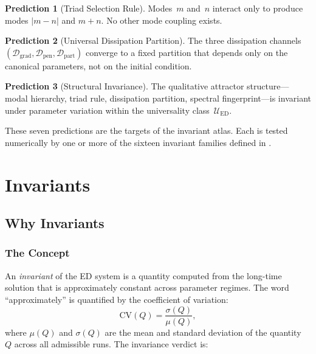 \documentclass[11pt,twoside,openright]{book}
\theoremstyle{definition}
\theoremstyle{plain}
\theoremstyle{definition}
\newtheorem{prediction}{Prediction}[chapter]
\theoremstyle{remark}
\newcommand{\Dgrad}{\mathcal{D}_{\mathrm{grad}}}
\newcommand{\Dpen}{\mathcal{D}_{\mathrm{pen}}}
\newcommand{\Dpart}{\mathcal{D}_{\mathrm{part}}}
\newcommand{\UED}{\mathcal{U}_{\mathrm{ED}}}
\newcommand{\CV}{\mathrm{CV}}
\begin{document}
\begin{prediction}[Triad Selection Rule]\label{pred:triad}
Modes~\(m\) and~\(n\) interact only to produce modes \(|m-n|\) and \(m+n\). No other mode coupling exists.
\end{prediction}

\begin{prediction}[Universal Dissipation Partition]\label{pred:dissipation}
The three dissipation channels \((\Dgrad, \Dpen, \Dpart)\) converge to a fixed partition that depends only on the canonical parameters, not on the initial condition.
\end{prediction}

\begin{prediction}[Structural Invariance]\label{pred:invariance}
The qualitative attractor structure---modal hierarchy, triad rule, dissipation partition, spectral fingerprint---is invariant under parameter variation within the universality class~\(\UED\).
\end{prediction}

These seven predictions are the targets of the invariant atlas. Each is tested numerically by one or more of the sixteen invariant families defined in \cref{part:invariants}.


\part{Invariants}\label{part:invariants}

\chapter{Why Invariants}\label{ch:why-invariants}

\section{The Concept}\label{sec:invariant-concept}

An \emph{invariant} of the ED system is a quantity computed from the long-time solution that is approximately constant across parameter regimes. The word ``approximately'' is quantified by the coefficient of variation:
\begin{equation}\label{eq:cv}
\CV(Q) = \frac{\sigma(Q)}{\mu(Q)},
\end{equation}
where \(\mu(Q)\) and \(\sigma(Q)\) are the mean and standard deviation of the quantity~\(Q\) across all admissible runs. The invariance verdict is:
\end{document}
